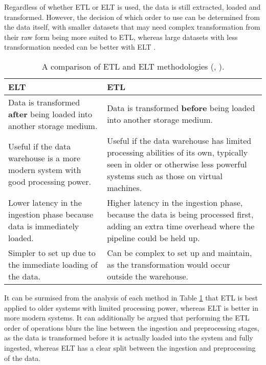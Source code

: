Regardless of whether ETL or ELT is used, the data is still extracted, loaded and transformed. However,
the decision of which order to use can be determined from the data itself, with smaller datasets that may need 
complex transformation from their raw form being more suited to ETL, whereas large datasets with less 
transformation needed can be better with ELT \autocite{smallcombe_etl_nodate}.

\begin{table}[H]
    \centering
        \begin{tabular}{ |p{}| p{}|}
            \hline
            \cellcolor{blue!25}ELT & \cellcolor{blue!25}ETL\\
            \hline
            Data is transformed \textbf{after} being loaded into another storage medium.
            & Data is transformed \textbf{before} being loaded into another storage medium. \\
            \hline
            Useful if the data warehouse is a more modern system with good processing power.
            & Useful if the data warehouse has limited processing abilities of its own,
            typically seen in older or otherwise less powerful systems such as those on 
            virtual machines.\\
            \hline
            Lower latency in the ingestion phase because data is immediately loaded. 
            & Higher latency in the ingestion phase, because the data is being processed first, 
            adding an extra time overhead where the pipeline could be held up.\\
            \hline 
            Simpler to set up due to the immediate loading of the data.
            & Can be complex to set up and maintain, as the transformation would occur outside the warehouse.\\
            \hline
    \end{tabular}
    \caption{A comparison of ETL and ELT methodologies (\textcite{bartley_etl_2024}, \textcite{aws_etl_nodate}).}\label{tab:ELT-ETL}
\end{table}

It can be surmised from the analysis of each method in Table \ref{tab:ELT-ETL} that ETL is best applied 
to older systems with limited processing power, whereas ELT is better in more modern systems. 
It can additionally be argued that performing the ETL order of operations blurs the line between the ingestion and 
preprocessing stages, as the data is transformed before it is actually loaded into the system and
fully ingested, whereas ELT has a clear split between the ingestion and preprocessing of the data. 

